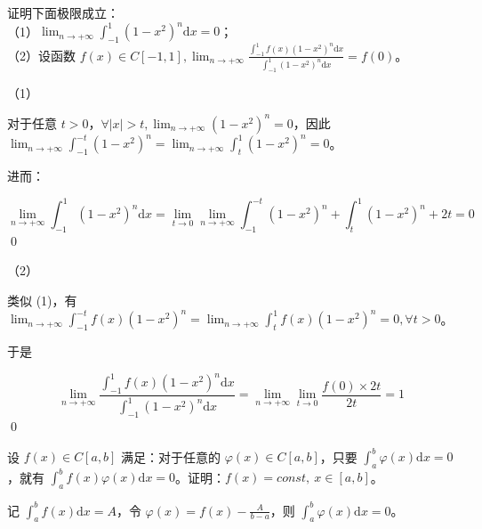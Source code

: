 \begin{ques}
	证明下面极限成立：\\（1）$\displaystyle \lim _{n\rightarrow +\infty }\int _{-1}^{1}\left( 1-x^{2}\right)^{n}\mathrm{d} x=0$；\\（2）设函数 $\displaystyle f( x) \in C[ -1,1] ,\lim _{n\rightarrow +\infty }\frac{\int _{-1}^{1} f( x)\left( 1-x^{2}\right)^{n}\mathrm{d} x}{\int _{-1}^{1}\left( 1-x^{2}\right)^{n}\mathrm{d} x} =f( 0)$。

\end{ques}


（1）

对于任意 $\displaystyle t >0$，$\displaystyle \forall |x| >t,\lim _{n\rightarrow +\infty }\left( 1-x^{2}\right)^{n} =0$，因此 $\displaystyle \lim _{n\rightarrow +\infty }\int _{-1}^{-t}\left( 1-x^{2}\right)^{n} =\lim _{n\rightarrow +\infty }\int _{t}^{1}\left( 1-x^{2}\right)^{n} =0$。

进而：


\begin{equation*}
	\lim _{n\rightarrow +\infty }\int _{-1}^{1}\left( 1-x^{2}\right)^{n}\mathrm{d} x=\lim _{t\rightarrow 0}\lim _{n\rightarrow +\infty }\int _{-1}^{-t}\left( 1-x^{2}\right)^{n} +\int _{t}^{1}\left( 1-x^{2}\right)^{n} +2t=0
\end{equation*}
\qed 

（2）

类似 (1)，有$\displaystyle \lim _{n\rightarrow +\infty }\int _{-1}^{-t} f( x)\left( 1-x^{2}\right)^{n} =\lim _{n\rightarrow +\infty }\int _{t}^{1} f( x)\left( 1-x^{2}\right)^{n} =0,\forall t >0$。

于是


\begin{equation*}
	\lim _{n\rightarrow +\infty }\frac{\int _{-1}^{1} f( x)\left( 1-x^{2}\right)^{n}\mathrm{d} x}{\int _{-1}^{1}\left( 1-x^{2}\right)^{n}\mathrm{d} x} =\lim _{n\rightarrow +\infty }\lim _{t\rightarrow 0}\frac{f( 0) \times 2t}{2t} =1
\end{equation*}
\qed 



\begin{ques}
	设 $\displaystyle f( x) \in C[ a,b]$ 满足：对于任意的 $\displaystyle \varphi ( x) \in C[ a,b]$，只要 $\displaystyle \int _{a}^{b} \varphi ( x)\mathrm{d} x=0$，就有 $\displaystyle \int _{a}^{b} f( x) \varphi ( x)\mathrm{d} x=0$。证明：$\displaystyle f( x) =const,\ x\in [ a,b]$。
\end{ques}


记 $\displaystyle \int _{a}^{b} f( x)\mathrm{d} x=A$，令 $\displaystyle \varphi ( x) =f( x) -\frac{A}{b-a}$，则 $\displaystyle \int _{a}^{b} \varphi ( x)\mathrm{d} x=0$。

